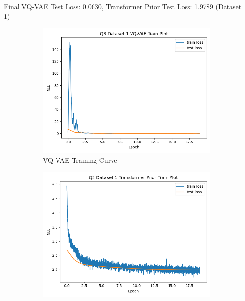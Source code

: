 \documentclass{article}
\begin{document}
\newpage
{}

Final VQ-VAE Test Loss: 0.0630, Transformer Prior Test Loss: 1.9789 (Dataset 1)
\begin{figure}[H]
       \centering
       \begin{subfigure}[b]{0.475\textwidth}
           \centering
           \includegraphics[width=\textwidth]{figures/q3_dset1_vqvae_train_plot.png}
           \caption{VQ-VAE Training Curve}
       \end{subfigure}
       \hfill
       \begin{subfigure}[b]{0.475\textwidth}
           \centering
           \includegraphics[width=\textwidth]{figures/q3_dset1_prior_train_plot.png}

\end{subfigure}
\end{figure}
\end{document}

